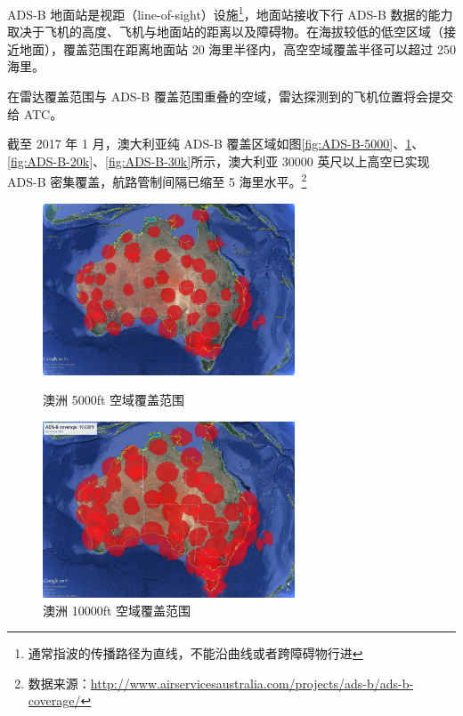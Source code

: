 ADS-B 地面站是视距（line-of-sight）设施\footnote{通常指波的传播路径为直线，不能沿曲线或者跨障碍物行进}，地面站接收下行 ADS-B 数据的能力取决于飞机的高度、飞机与地面站的距离以及障碍物。在海拔较低的低空区域（接近地面），覆盖范围在距离地面站 20 海里半径内，高空空域覆盖半径可以超过 250 海里。

在雷达覆盖范围与 ADS-B 覆盖范围重叠的空域，雷达探测到的飞机位置将会提交给 ATC。

截至 2017 年 1 月，澳大利亚纯 ADS-B 覆盖区域如图\ref{fig:ADS-B-5000}、\ref{fig:ADS-B-10k}、\ref{fig:ADS-B-20k}、\ref{fig:ADS-B-30k}所示，澳大利亚 30000 英尺以上高空已实现 ADS-B 密集覆盖，航路管制间隔已缩至 5 海里水平。\footnote{数据来源：\url{http://www.airservicesaustralia.com/projects/ads-b/ads-b-coverage/}}

\begin{figure}[htbp]
\centering
\begin{minipage}[t]{0.48\textwidth}
\centering
\includegraphics[width=7.5cm]{pic/ADS-B-5000.jpg}
\caption{澳洲 5000ft 空域覆盖范围}
\label{fig:ADS-B-5000}
\end{minipage}
\begin{minipage}[t]{0.48\textwidth}
\centering
\includegraphics[width=7.5cm]{pic/ADS-B-10k.jpg}
\caption{澳洲 10000ft 空域覆盖范围}
\label{fig:ADS-B-10k}
\end{minipage}
\end{figure}

